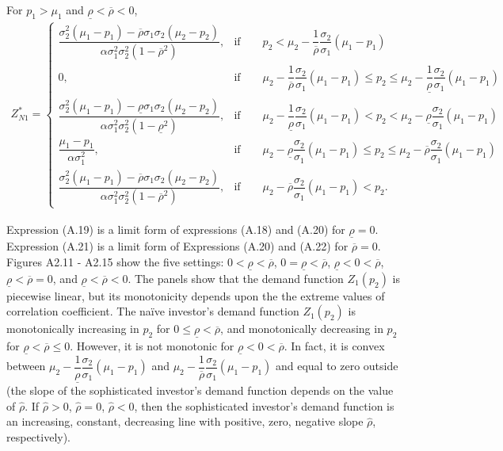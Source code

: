 \documentclass[10pt]{article}
\begin{document}
For $ p_1 > \mu_1 $ and $ \underline{\rho} < \overline{\rho} < 0 $,
{\footnotesize \begin{eqnarray}
Z_{N 1}^* = \left\{ \begin{matrix}
\dfrac{\sigma_2^2 (\mu_1 - p_1) - \overline{\rho} \sigma_1 \sigma_2 (\mu_2 - p_2)}{\alpha \sigma_1^2 \sigma_2^2 (1 - \overline{\rho}^2)}, & \text{if} \qquad p_2 < \mu_2 - \dfrac1{\overline{\rho}} \dfrac{\sigma_2}{\sigma_1} (\mu_1 - p_1) \\
0, & \text{if} \qquad \mu_2 - \dfrac1{\overline{\rho}} \dfrac{\sigma_2}{\sigma_1} (\mu_1 - p_1) \leqslant p_2 \leqslant \mu_2 - \dfrac1{\underline{\rho}} \dfrac{\sigma_2}{\sigma_1} (\mu_1 - p_1) \\
\dfrac{\sigma_2^2 (\mu_1 - p_1) - \underline{\rho} \sigma_1 \sigma_2 (\mu_2 - p_2)}{\alpha \sigma_1^2 \sigma_2^2 (1 - \underline{\rho}^2)}, & \text{if} \qquad \mu_2 - \dfrac1{\underline{\rho}} \dfrac{\sigma_2}{\sigma_1} (\mu_1 - p_1) < p_2 < \mu_2 - \underline{\rho} \dfrac{\sigma_2}{\sigma_1} (\mu_1 - p_1) \\
\dfrac{\mu_1 - p_1}{\alpha \sigma_1^2}, & \text{if} \qquad \mu_2 - \underline{\rho} \dfrac{\sigma_2}{\sigma_1} (\mu_1 - p_1) \leqslant p_2 \leqslant \mu_2 - \overline{\rho} \dfrac{\sigma_2}{\sigma_1} (\mu_1 - p_1) \\
\dfrac{\sigma_2^2 (\mu_1 - p_1) - \overline{\rho} \sigma_1 \sigma_2 (\mu_2 - p_2)}{\alpha \sigma_1^2 \sigma_2^2 (1 - \overline{\rho}^2)}, & \text{if} \qquad \mu_2 - \overline{\rho} \dfrac{\sigma_2}{\sigma_1} (\mu_1 - p_1) < p_2.
\end{matrix} \right.
\end{eqnarray}}

Expression (A.19) is a limit form of expressions (A.18) and (A.20) for $ \underline{\rho} = 0 $.
Expression (A.21) is a limit form of Expressions (A.20) and (A.22) for $ \overline{\rho} = 0 $.
Figures A2.11 - A2.15 show the five settings: $ 0 < \underline{\rho} < \overline{\rho} $, $ 0 = \underline{\rho} < \overline{\rho} $, $ \underline{\rho} < 0 < \overline{\rho} $, $ \underline{\rho} < \overline{\rho} = 0 $, and $ \underline{\rho} < \overline{\rho} < 0 $. The panels show that the demand function $ Z_1 (p_2) $ is piecewise linear, but its monotonicity depends upon the the extreme values of correlation coefficient. The na\"ive investor's demand function $ Z_1 (p_2) $ is monotonically increasing in $ p_2 $ for $ 0 \leqslant \underline{\rho} < \overline{\rho} $, and monotonically decreasing in $ p_2 $ for $ \underline{\rho} < \overline{\rho} \leqslant 0 $. However, it is not monotonic for $ \underline{\rho} < 0 < \overline{\rho} $. In fact, it is convex between $ \mu_2 - \dfrac1{\underline{\rho}} \dfrac{\sigma_2}{\sigma_1} (\mu_1 - p_1) $ and $ \mu_2 - \dfrac1{\overline{\rho}} \dfrac{\sigma_2}{\sigma_1} (\mu_1 - p_1) $ and equal to zero outside (the slope of the sophisticated investor's demand function depends on the value of $ \hat{\rho} $. If $ \hat{\rho} > 0 $, $ \hat{\rho} = 0 $, $ \hat{\rho} < 0 $, then the sophisticated investor's demand function is an increasing, constant, decreasing line with positive, zero, negative slope $ \hat{\rho} $, respectively).
\end{document}
